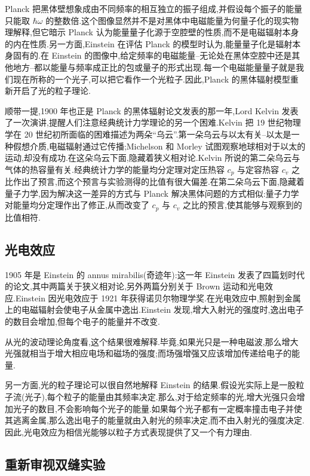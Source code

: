 Planck 把黑体壁想象成由不同频率的相互独立的振子组成,并假设每个振子的能量只能取 $\hbar\omega$ 的整数倍.这个图像显然并不是对黑体中电磁能量为何量子化的现实物理解释,但它暗示 Planck 认为能量量子化源于空腔壁的性质,而不是电磁辐射本身的内在性质.另一方面,Einstein 在评估 Planck 的模型时认为,能量量子化是辐射本身固有的.在 Einstein 的图像中,给定频率的电磁能量--无论处在黑体空腔中还是其他地方--都以能量与频率成正比的包或量子的形式出现.每一个电磁能量量子就是我们现在所称的一个光子,可以把它看作一个光粒子.因此,Planck 的黑体辐射模型重新开启了光的粒子理论.

顺带一提,1900 年也正是 Planck 的黑体辐射论文发表的那一年,Lord Kelvin 发表了一次演讲,提醒人们注意经典统计力学理论的另一个困难.Kelvin 把 19 世纪物理学在 20 世纪初所面临的困难描述为两朵“乌云”.第一朵乌云与以太有关--以太是一种假想介质,电磁辐射通过它传播;Michelson 和 Morley 试图观察地球相对于以太的运动,却没有成功.在这朵乌云下面,隐藏着狭义相对论.Kelvin 所说的第二朵乌云与气体的热容量有关.经典统计力学的能量均分定理对定压热容 $c_p$ 与定容热容 $c_v$ 之比作出了预言,而这个预言与实验测得的比值有很大偏差.在第二朵乌云下面,隐藏着量子力学,因为解决这一差异的方式与 Planck 解决黑体问题的方式相似:量子力学对能量均分定理作出了修正,从而改变了 $c_p$ 与 $c_v$ 之比的预言,使其能够与观察到的比值相符.

\subsection{光电效应}\label{subsec:photoelectric-effect}

1905 年是 Einstein 的 annus mirabilis(奇迹年):这一年 Einstein 发表了四篇划时代的论文,其中两篇关于狭义相对论,另外两篇分别关于 Brown 运动和光电效应.Einstein 因光电效应于 1921 年获得诺贝尔物理学奖.在光电效应中,照射到金属上的电磁辐射会使电子从金属中逸出.Einstein 发现,增大入射光的强度时,逸出电子的数目会增加,但每个电子的能量并不改变.

从光的波动理论角度看,这个结果很难解释.毕竟,如果光只是一种电磁波,那么增大光强就相当于增大相应电场和磁场的强度;而场强增强又应该增加传递给电子的能量.

另一方面,光的粒子理论可以很自然地解释 Einstein 的结果.假设光实际上是一股粒子流(光子),每个粒子的能量由其频率决定.那么,对于给定频率的光,增大光强只会增加光子的数目,不会影响每个光子的能量.如果每个光子都有一定概率撞击电子并使其逃离金属,那么逸出电子的能量就由入射光的频率决定,而不由入射光的强度决定.因此,光电效应为相信光能够以粒子方式表现提供了又一个有力理由.

\subsection{重新审视双缝实验}\label{subsec:double-slit-revisited}

